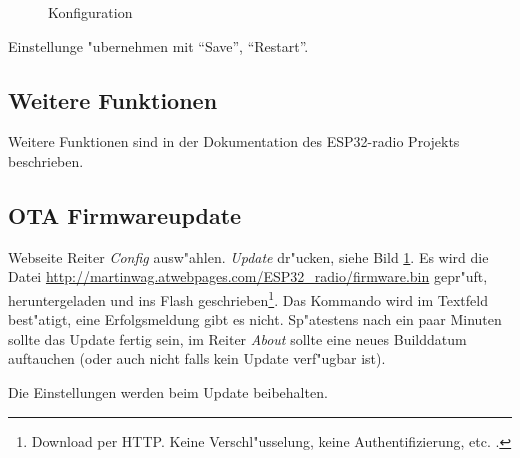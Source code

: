 \documentclass[ngerman,11pt,parskip=half] {scrartcl}
\begin{document}
\begin{figure}[H]
\centering
{}
\caption{Konfiguration} \label{fig:config}
\end{figure}

Einstellunge "ubernehmen mit "`Save"', "`Restart"'.

\subsection{Weitere Funktionen}

Weitere Funktionen sind in der Dokumentation des ESP32-radio Projekts beschrieben.

\subsection{OTA Firmwareupdate}

Webseite Reiter \emph{Config} ausw"ahlen. \emph{Update} dr"ucken, siehe Bild \ref{fig:config}. Es wird die Datei \url{http://martinwag.atwebpages.com/ESP32_radio/firmware.bin} gepr"uft, heruntergeladen und ins Flash geschrieben\footnote{Download per HTTP. Keine Verschl"usselung, keine Authentifizierung, etc. .}. Das Kommando wird im Textfeld best"atigt, eine Erfolgsmeldung gibt es nicht. Sp"atestens nach ein paar Minuten sollte das Update fertig sein, im Reiter \emph{About} sollte eine neues Builddatum auftauchen (oder auch nicht falls kein Update verf"ugbar ist). 

Die Einstellungen werden beim Update beibehalten.
\end{document}
